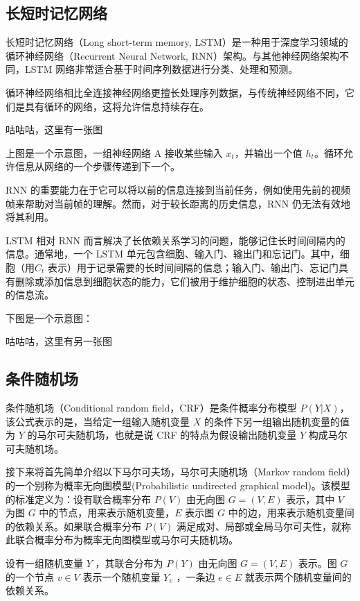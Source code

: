 \subsection{长短时记忆网络}

长短时记忆网络（Long short-term memory, LSTM）是一种用于深度学习领域的循环神经网络（Recurrent Neural Network, RNN）架构。与其他神经网络架构不同，LSTM 网络非常适合基于时间序列数据进行分类、处理和预测。

循环神经网络相比全连接神经网络更擅长处理序列数据，与传统神经网络不同，它们是具有循环的网络，这将允许信息持续存在。

咕咕咕，这里有一张图

上图是一个示意图，一组神经网络 A 接收某些输入 ${\displaystyle x_t}$，并输出一个值 ${\displaystyle h_t}$。循环允许信息从网络的一个步骤传递到下一个。

RNN 的重要能力在于它可以将以前的信息连接到当前任务，例如使用先前的视频帧来帮助对当前帧的理解。然而，对于较长距离的历史信息，RNN 仍无法有效地将其利用。

LSTM 相对 RNN 而言解决了长依赖关系学习的问题，能够记住长时间间隔内的信息。通常地，一个 LSTM 单元包含细胞、输入门、输出门和忘记门。其中，细胞（用${\displaystyle C_t}$ 表示）用于记录需要的长时间间隔的信息；输入门、输出门、忘记门具有删除或添加信息到细胞状态的能力，它们被用于维护细胞的状态、控制进出单元的信息流。

下图是一个示意图：

咕咕咕，这里有另一张图
\fi

\subsection{条件随机场}
条件随机场（Conditional random field，CRF）是条件概率分布模型 $P(Y|X)$，该公式表示的是，当给定一组输入随机变量 $X$ 的条件下另一组输出随机变量的值为 $Y$ 的马尔可夫随机场，也就是说 CRF 的特点为假设输出随机变量 $Y$ 构成马尔可夫随机场。

接下来将首先简单介绍以下马尔可夫场，马尔可夫随机场（Markov random field）的一个别称为概率无向图模型(Probabilistic undirected graphical model)。该模型的标准定义为：设有联合概率分布 $P(V)$ 由无向图 $G=(V, E)$ 表示，其中 $V$ 为图 $G$ 中的节点，用来表示随机变量，$E$ 表示图 $G$ 中的边，用来表示随机变量间的依赖关系。如果联合概率分布 $P(V)$ 满足成对、局部或全局马尔可夫性，就称此联合概率分布为概率无向图模型或马尔可夫随机场。

设有一组随机变量 $Y$ ，其联合分布为 $P(Y)$ 由无向图 $G=(V, E)$ 表示。图 $G$ 的一个节点 $v \in V$ 表示一个随机变量 $Y_v$ ，一条边 $e \in E$ 就表示两个随机变量间的依赖关系。

